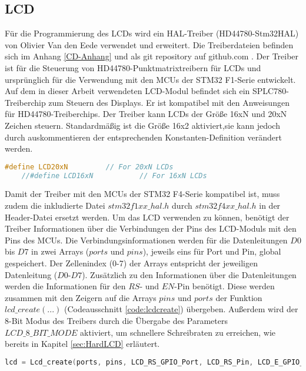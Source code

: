 \subsection{LCD}
Für die Programmierung des LCDs wird ein HAL-Treiber (HD44780-Stm32HAL) von Olivier Van den Eede verwendet und erweitert. Die Treiberdateien befinden sich im Anhang \ref{CD-Anhang} und als git repository auf github.com \cite{git_lcd}. Der Treiber ist für die Steuerung von HD44780-Punktmatrixtreibern für LCDs und ursprünglich für die Verwendung mit den MCUs der STM32 F1-Serie entwickelt. Auf dem in dieser Arbeit verwendeten LCD-Modul befindet sich ein SPLC780-Treiberchip zum Steuern des Displays. Er ist kompatibel mit den Anweisungen für HD44780-Treiberchips. Der Treiber kann LCDs der Größe 16xN und 20xN Zeichen steuern. Standardmäßig ist die Größe 16x2 aktiviert,sie kann jedoch durch auskommentieren der entsprechenden Konstanten-Definition verändert werden. 
\begin{lstlisting}[firstnumber=16, language=C, caption = lcd.h: Einstellung Displaygröße, label = code:lcdsize]
	#define LCD20xN 		// For 20xN LCDs
	//#define LCD16xN			// For 16xN LCDs
\end{lstlisting}
Damit der Treiber mit den MCUs der STM32 F4-Serie kompatibel ist, muss zudem die inkludierte Datei $stm32f1xx\_hal.h$ durch $stm32f4xx\_hal.h$ in der Header-Datei ersetzt werden.
\newline
Um das LCD verwenden zu können, benötigt der Treiber Informationen über die Verbindungen der Pins des LCD-Moduls mit den Pins des MCUs. Die Verbindungsinformationen werden für die Datenleitungen $D0$ bis $D7$ in zwei Arrays ($ports$ und $pins$), jeweils eins für Port und Pin, global gespeichert. Der Zellenindex (0-7) der Arrays entspricht der jeweiligen Datenleitung ($D0$-$D7$). Zusätzlich zu den Informationen über die Datenleitungen werden die Informationen für den $RS$- und $EN$-Pin benötigt. Diese werden zusammen mit den Zeigern auf die Arrays $pins$ und $ports$ der Funktion $lcd\_create(...)$ (Codeausschnitt \ref{code:lcdcreate}) übergeben. Außerdem wird der 8-Bit Modus des Treibers durch die Übergabe des Parameters $LCD\_8\_BIT\_MODE$ aktiviert, um schnellere Schreibraten zu erreichen, wie bereits in Kapitel \ref{sec:HardLCD} erläutert.
\begin{lstlisting}[firstnumber=302, language=C, caption = main.c: Funktionsaufruf lcd\_create(...), label = code:lcdcreate, breaklines = true]
lcd = Lcd_create(ports, pins, LCD_RS_GPIO_Port, LCD_RS_Pin, LCD_E_GPIO_Port, LCD_E_Pin, LCD_8_BIT_MODE);
\end{lstlisting}
